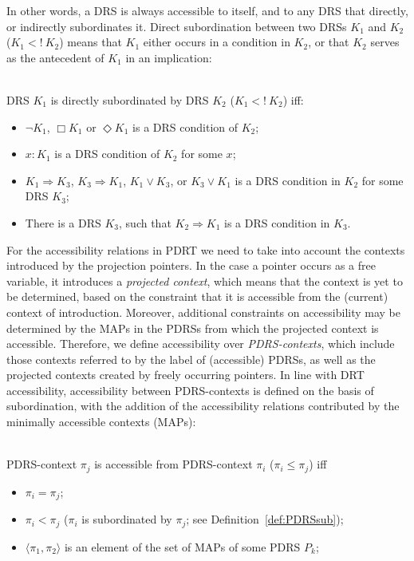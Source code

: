 \noindent In other words, a DRS is always accessible to itself, and to any
DRS that directly, or indirectly subordinates it.  Direct subordination
between two DRSs $K_1$ and $K_2$ ($K_1 <!~K_2$) means that $K_1$ either
occurs in a condition in $K_2$, or that $K_2$ serves as the antecedent of
$K_1$ in an implication:

\begin{subdefinition}\label{def:DRSdsub}~\\
DRS $K_1$ is directly subordinated by DRS $K_2$ ($K_1 <!~K_2$) iff:
  \begin{itemize}
    \item $\neg K_1$, $\Box K_1$ or $\Diamond K_1$ is a DRS condition of
      $K_2$;
    \item $x:K_1$ is a DRS condition of $K_2$ for some $x$;
    \item $K_1 \Rightarrow K_3$, $K_3 \Rightarrow K_1$, $K_1 \vee K_3$, or 
      $K_3 \vee K_1$ is a DRS condition in $K_2$ for some DRS $K_3$;
    \item There is a DRS $K_3$, such that $K_2 \Rightarrow K_1$
      is a DRS condition in $K_3$.
  \end{itemize}
\end{subdefinition}

For the accessibility relations in PDRT we need to take into account the
contexts introduced by the projection pointers. In the case a pointer occurs
as a free variable, it introduces a \textit{projected context}, which means
that the context is yet to be determined, based on the constraint that it is
accessible from the (current) context of introduction.  Moreover, additional
constraints on accessibility may be determined by the MAPs in the PDRSs from
which the projected context is accessible.
Therefore, we define accessibility over \textit{PDRS-contexts}, which
include those contexts referred to by the label of (accessible) PDRSs, as
well as the projected contexts created by freely occurring pointers.  In
line with DRT accessibility, accessibility between PDRS-contexts is defined
on the basis of subordination, with the addition of the accessibility
relations contributed by the minimally accessible contexts (MAPs):

\begin{definition}~\\
PDRS-context $\pi_j$ is accessible from PDRS-context $\pi_i$ 
($\pi_i \leq \pi_j$) iff
  \begin{itemize}
    \item $\pi_i = \pi_j$;
    \item $\pi_i < \pi_j$ ($\pi_i$ is subordinated by $\pi_j$; see
      Definition~\ref{def:PDRSsub});
    \item $\langle \pi_1,\pi_2 \rangle$ is an element of the set of
     MAPs of some PDRS $P_k$;
  \end{itemize}
\end{definition}

